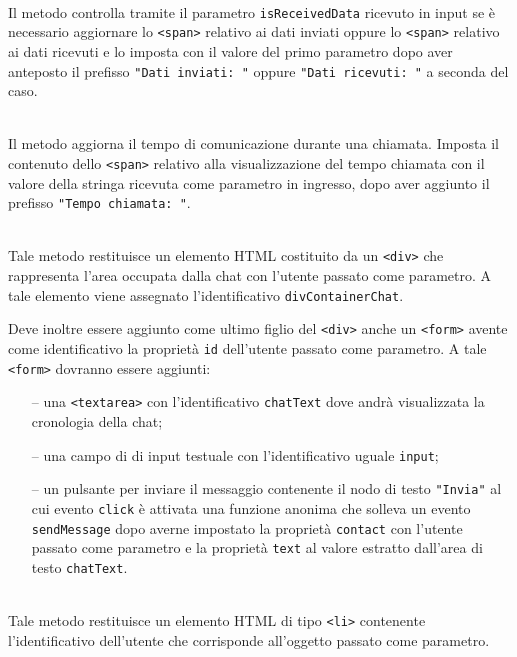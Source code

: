 \begin{description}
  \item{}\\
  Il metodo controlla tramite il parametro \verb'isReceivedData' ricevuto in input se è necessario aggiornare lo \verb'<span>' relativo ai dati inviati oppure lo \verb'<span>' relativo ai dati ricevuti e lo imposta con il valore del primo parametro dopo aver anteposto il prefisso \verb'"Dati inviati: "' oppure \verb'"Dati ricevuti: "' a seconda del caso.

  \item{}\\
  Il metodo aggiorna il tempo di comunicazione durante una chiamata. Imposta il contenuto dello \verb'<span>' relativo alla visualizzazione del tempo chiamata con il valore della stringa ricevuta come parametro in ingresso, dopo aver aggiunto il prefisso \verb'"Tempo chiamata: "'.

  \item{}\\
  Tale metodo restituisce un elemento HTML costituito da un \verb'<div>' che rappresenta l'area occupata dalla chat con l'utente passato come parametro. A tale elemento viene assegnato l'identificativo \verb'divContainerChat'.
  
  Deve inoltre essere aggiunto come ultimo figlio del \verb'<div>' anche un \verb'<form>' avente come identificativo la proprietà \verb'id' dell'utente passato come parametro. A tale \verb'<form>' dovranno essere aggiunti:
  \begin{itemize}
    \item[--] una \verb'<textarea>' con l'identificativo \verb'chatText' dove andrà visualizzata la cronologia della chat;
    \item[--] una campo di di input testuale con l'identificativo uguale \verb'input';
    \item[--] un pulsante per inviare il messaggio contenente il nodo di testo \verb'"Invia"' al cui evento \verb'click' è attivata una funzione anonima che solleva un evento \verb'sendMessage' dopo averne impostato la proprietà \verb'contact' con l'utente passato come parametro e la proprietà \verb'text' al valore estratto dall'area di testo \verb'chatText'.
  \end{itemize}

  \item{}\\
  Tale metodo restituisce un elemento HTML di tipo \verb'<li>' contenente l'identificativo dell'utente che corrisponde all'oggetto passato come parametro.
  

\end{description}
